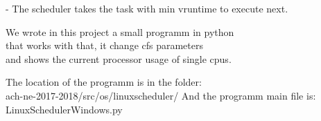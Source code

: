 \documentclass[a4paper, oneside]{scrreprt}
\begin{document}
- The scheduler takes the task with min vruntime to execute next.

We wrote in this project a small programm in python \\that works with that, it change cfs parameters \\and shows the current processor usage of single cpus.

The location of the programm is in the folder: \\ach-ne-2017-2018/src/os/linuxscheduler/
And the programm main file is: LinuxSchedulerWindows.py
\end{document}
